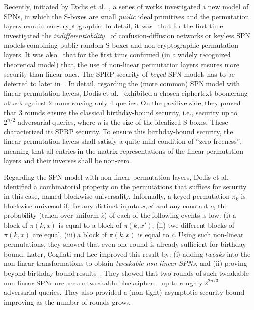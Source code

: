 Recently, initiated by Dodis et al.~\cite{EC:DSSL16,EPRINT:DKSTZ17}, a series of works investigated a new model of SPNs, in which the S-boxes
are small {\it public} ideal primitives and the permutation layers remain non-cryptographic. In detail, it was~\cite{EC:DSSL16} that for the first time investigated the {\it indifferentiability}~\cite{TCC:MauRenHol04}
of confusion-diffusion networks or keyless SPN models  combining public random S-boxes and non-cryptographic permutation layers. It was also~\cite{EC:DSSL16} that for the first time confirmed (in a widely recognized theoretical model) that, the use of non-linear permutation layers ensures more security than linear ones. The SPRP security of {\it keyed} SPN models has to be deferred to later in~\cite{EPRINT:DKSTZ17,C:CDKLST18}. In detail, regarding the (more common) SPN model with linear permutation layers, Dodis et al.~\cite{EPRINT:DKSTZ17} exhibited a chosen-ciphertext boomerang attack against 2 rounds using only 4 queries. On the positive side, they proved that 3 rounds ensure the classical birthday-bound security, i.e., security up to $2^{n/2}$ adversarial queries, where $n$ is the size of the idealized S-boxes. These characterized its SPRP security. To ensure this birthday-bound security, the linear permutation layers shall satisfy a quite mild condition of ``zero-freeness'', meaning that all entries in the matrix representations of the linear permutation layers and their inverses shall be non-zero.



Regarding the SPN model with non-linear permutation layers, Dodis et al.~\cite{EPRINT:DKSTZ17} identified a combinatorial property on the permutations that suffices for security in this case, named blockwise universality. Informally, a keyed permutation $\pi_k$ is blockwise universal if, for any distinct inputs $x,x'$ and any constant $c$, the probability (taken over uniform $k$) of each of the following events is low: (i) a block of $\pi(k,x)$ is equal to a block of $\pi(k,x')$, (ii) two different blocks of $\pi(k,x)$ are equal, (iii) a block of $\pi(k,x)$ is equal to $c$. Using such non-linear permutations, they showed that even one round is already sufficient for birthday-bound. Later, Cogliati and Lee improved this result by: (i) adding {\it tweaks} into the non-linear transformations
to obtain {\it tweakable non-linear SPNs}, and (ii) proving beyond-birthday-bound results~\cite{EPRINT:CogLee18}. They showed that two rounds of such tweakable non-linear SPNs are secure tweakable blockciphers~\cite{JC:LisRivWag11} up to roughly $2^{2n/3}$ adversarial queries. They also provided a (non-tight) asymptotic security bound improving as the number of rounds grows.


